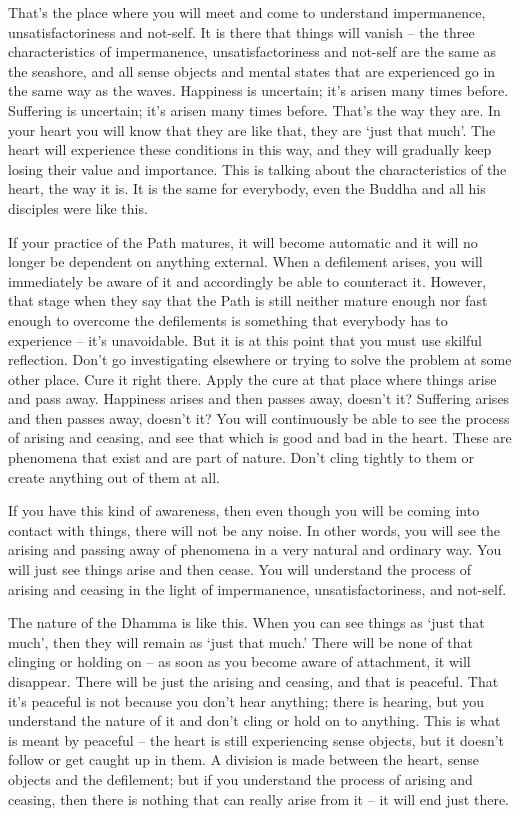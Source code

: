 That's the place where you will meet and come to understand
impermanence, unsatisfactoriness and not-self. It is there that things
will vanish -- the three characteristics of impermanence, 
unsatisfactoriness and not-self are the same as the seashore, and all
sense objects and mental states that are experienced go in the same way
as the waves. Happiness is uncertain; it's arisen many times before. 
Suffering is uncertain; it's arisen many times before. That's the way
they are. In your heart you will know that they are like that, they are
`just that much'. The heart will experience these conditions in this
way, and they will gradually keep losing their value and importance. 
This is talking about the characteristics of the heart, the way it is. 
It is the same for everybody, even the Buddha and all his disciples were
like this. 

If your practice of the Path matures, it will become automatic and it
will no longer be dependent on anything external. When a defilement
arises, you will immediately be aware of it and accordingly be able to
counteract it. However, that stage when they say that the Path is still
neither mature enough nor fast enough to overcome the defilements is
something that everybody has to experience -- it's unavoidable. But it
is at this point that you must use skilful reflection. Don't go
investigating elsewhere or trying to solve the problem at some other
place. Cure it right there. Apply the cure at that place where things
arise and pass away. Happiness arises and then passes away, doesn't it? 
Suffering arises and then passes away, doesn't it? You will continuously
be able to see the process of arising and ceasing, and see that which is
good and bad in the heart. These are phenomena that exist and are part
of nature. Don't cling tightly to them or create anything out of them at
all. 

If you have this kind of awareness, then even though you will be coming
into contact with things, there will not be any noise. In other words, 
you will see the arising and passing away of phenomena in a very natural
and ordinary way. You will just see things arise and then cease. You
will understand the process of arising and ceasing in the light of
impermanence, unsatisfactoriness, and not-self. 

The nature of the Dhamma is like this. When you can see things as `just
that much', then they will remain as `just that much.' There will be
none of that clinging or holding on -- as soon as you become aware of
attachment, it will disappear. There will be just the arising and
ceasing, and that is peaceful. That it's peaceful is not because you
don't hear anything; there is hearing, but you understand the nature of
it and don't cling or hold on to anything. This is what is meant by
peaceful -- the heart is still experiencing sense objects, but it
doesn't follow or get caught up in them. A division is made between the
heart, sense objects and the defilement; but if you understand the
process of arising and ceasing, then there is nothing that can really
arise from it -- it will end just there. 

